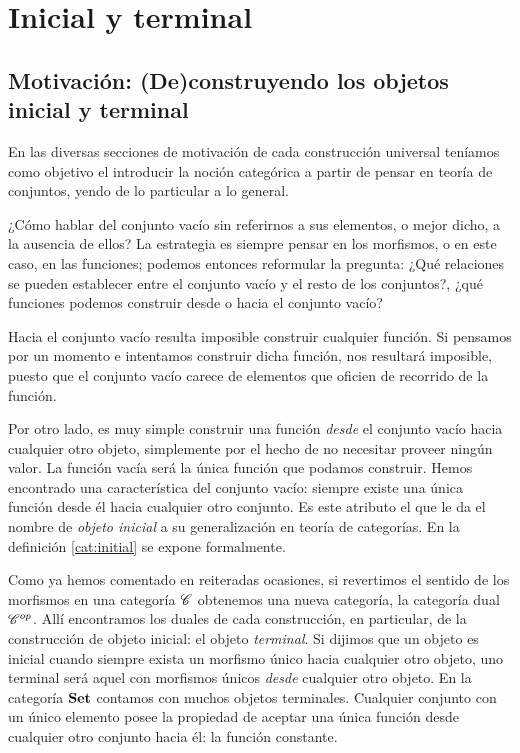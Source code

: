\section{Inicial y terminal}
\subsection{Motivación: (De)construyendo los objetos inicial y terminal}
\label{mot:initterm}
En las diversas secciones de motivación de cada construcción universal teníamos como objetivo el introducir la noción categórica a partir de pensar en teoría de conjuntos, yendo de lo particular a lo general. 

¿Cómo hablar del conjunto vacío sin referirnos a sus elementos, o mejor dicho, a la ausencia de ellos? La estrategia es siempre pensar en los morfismos, o en este caso, en las funciones; podemos entonces reformular la pregunta: ¿Qué relaciones se pueden establecer entre el conjunto vacío y el resto de los conjuntos?, ¿qué funciones podemos construir desde o hacia el conjunto vacío?

Hacia el conjunto vacío resulta imposible construir cualquier función.
Si pensamos por un momento e intentamos construir dicha función, nos resultará imposible, puesto que el conjunto vacío carece de elementos que oficien de recorrido de la función.

Por otro lado, es muy simple construir una función {\it desde} el conjunto vacío hacia cualquier otro objeto, simplemente por el hecho de no necesitar proveer ningún valor. La función vacía será la única función que podamos construir. Hemos encontrado una característica del conjunto vacío: siempre existe una única función desde él hacia cualquier otro conjunto. Es este atributo el que le da el nombre de {\it objeto inicial}
a su generalización en teoría de categorías. En la definición \ref{cat:initial} se expone formalmente.

Como ya hemos comentado en reiteradas ocasiones, si revertimos el sentido de los morfismos en una categoría $\mathscr{C}$ obtenemos una nueva categoría, la categoría dual $\mathscr{C}^{op}$. Allí encontramos los duales de cada construcción, en particular, de la construcción de objeto inicial: el objeto {\it terminal}. Si dijimos que un objeto es inicial cuando siempre exista un morfismo único hacia cualquier otro objeto, uno terminal será aquel con morfismos únicos {\it desde} cualquier otro objeto. En la categoría $\mathbf{Set}$ contamos con muchos objetos terminales. Cualquier conjunto con un único elemento posee la propiedad de aceptar una única función desde cualquier otro conjunto hacia él: la función constante.


